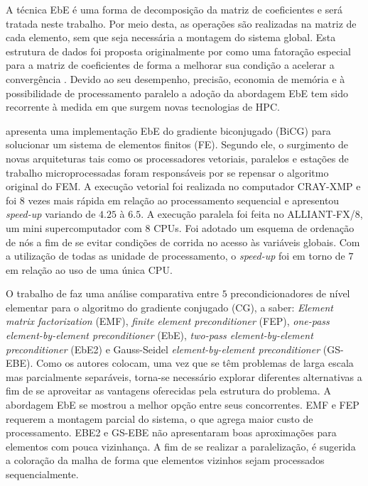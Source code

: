 \documentclass[
    12pt,               %
    openright,          %
    oneside,
    a4paper,            %
    english,            %
    french,             %
    spanish,            %
    brazil              %
    ]{abntex2}
\begin{document}
A técnica EbE é uma forma de decomposição da matriz de coeficientes e será tratada neste trabalho. Por meio desta, as operações são realizadas na matriz de cada elemento, sem que seja necessária a montagem do sistema global. Esta estrutura de dados foi proposta originalmente por  como uma fatoração especial para a matriz de coeficientes de forma a melhorar sua condição a acelerar a convergência \cite{Carey1988}. Devido ao seu desempenho, precisão, economia de memória e à possibilidade de processamento paralelo \cite{Levit1987, Jing2008, Kiss2012} a adoção da abordagem EbE tem sido recorrente à medida em que surgem novas tecnologias de HPC. 

 apresenta uma implementação EbE do gradiente biconjugado (BiCG) para solucionar um sistema de elementos finitos (FE). Segundo ele, o surgimento de novas arquiteturas tais como os processadores vetoriais, paralelos e estações de trabalho microprocessadas foram responsáveis por se repensar o algoritmo original do FEM. A execução vetorial foi realizada no computador CRAY-XMP e foi $8$ vezes mais rápida em relação ao processamento sequencial e apresentou \textit{speed-up} variando de $4.25$ à $6.5$. A execução paralela foi feita no ALLIANT-FX/8, um mini supercomputador com $8$ CPUs. Foi adotado um esquema de ordenação de nós a fim de se evitar condições de corrida no acesso às variáveis globais. Com a utilização de todas as unidade de processamento, o \textit{speed-up} foi em torno de $7$ em relação ao uso de uma única CPU. 

O trabalho de  faz uma análise comparativa entre $5$ precondicionadores de nível elementar para o algoritmo do gradiente conjugado (CG), a saber: \textit{Element matrix factorization} (EMF), \textit{finite element preconditioner} (FEP), \textit{one-pass element-by-element preconditioner} (EbE), \textit{two-pass element-by-element preconditioner} (EbE2) e Gauss-Seidel \textit{element-by-element preconditioner} (GS-EBE). Como os autores colocam, uma vez que se têm problemas de larga escala mas parcialmente separáveis, torna-se necessário explorar diferentes alternativas a fim de se aproveitar as vantagens oferecidas pela estrutura do problema. A abordagem EbE se mostrou a melhor opção entre seus concorrentes. EMF e FEP requerem a montagem parcial do sistema, o que agrega maior custo de processamento. EBE2 e GS-EBE não apresentaram boas aproximações para elementos com pouca vizinhança. A fim de se realizar a paralelização, é sugerida a coloração da malha de forma que elementos vizinhos sejam processados sequencialmente.
\end{document}
